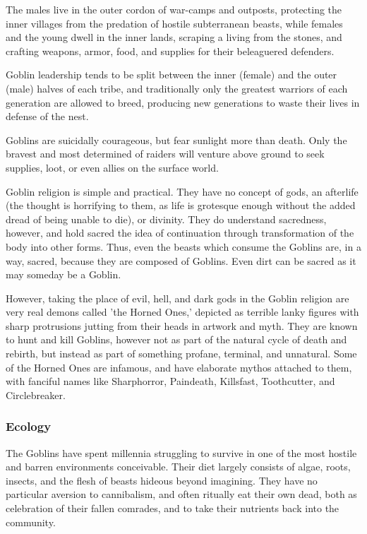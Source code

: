 \documentclass[oneside,11pt,english]{book}
\begin{document}
The males live in the outer cordon of war-camps and outposts, protecting the inner villages from the 
predation of hostile subterranean beasts, while females and the young dwell in the inner lands, scraping a 
living from the stones, and crafting weapons, armor, food, and supplies for their beleaguered defenders. 


Goblin leadership tends to be split between the inner (female) and the outer (male) halves of each tribe, 
and traditionally only the greatest warriors of each generation are allowed to breed, producing new 
generations to waste their lives in defense of the nest. 


Goblins are suicidally courageous, but fear sunlight more than death. Only the bravest and most 
determined of raiders will venture above ground to seek supplies, loot, or even allies on the surface world. 


Goblin religion is simple and practical. They have no concept of gods, an afterlife (the thought is 
horrifying to them, as life is grotesque enough without the added dread of being unable to die), or 
divinity. They do understand sacredness, however, and hold sacred the idea of continuation through 
transformation of the body into other forms. Thus, even the beasts which consume the Goblins are, in a 
way, sacred, because they are composed of Goblins. Even dirt can be sacred as it may someday be a 
Goblin. 


However, taking the place of evil, hell, and dark gods in the Goblin religion are very real demons called 
'the Horned Ones,' depicted as terrible lanky figures with sharp protrusions jutting from their heads in 
artwork and myth. They are known to hunt and kill Goblins, however not as part of the natural cycle of 
death and rebirth, but instead as part of something profane, terminal, and unnatural. Some of the Horned 
Ones are infamous, and have elaborate mythos attached to them, with fanciful names like Sharphorror, 
Paindeath, Killsfast, Toothcutter, and Circlebreaker. 
\subsubsection*{Ecology} 
The Goblins have spent millennia struggling to survive in one of the most hostile and barren 
environments conceivable. Their diet largely consists of algae, roots, insects, and the flesh of beasts 
hideous beyond imagining. They have no particular aversion to cannibalism, and often ritually eat their 
own dead, both as celebration of their fallen comrades, and to take their nutrients back into the 
community. 
\end{document}
